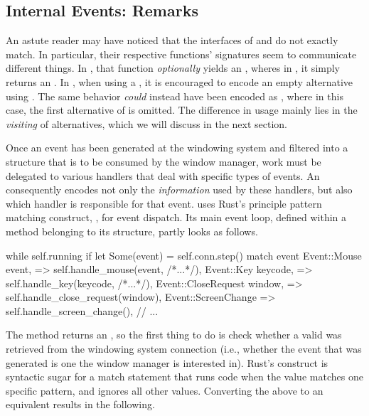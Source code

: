 \subsection{Internal Events: Remarks}

An astute reader may have noticed that the  interfaces of
\wmrs and \wmcpp do not exactly match. In particular, their respective
 functions' signatures seem to communicate different things. In
\wmrs, that function \textit{optionally} yields an , wheres
in \wmcpp, it simply returns an . In \cpp, when using a
, it is encouraged to encode an empty alternative using
\cite{cppstd}. The same behavior \textit{could} instead
have been encoded as , where in this case, the first
alternative of  is omitted. The difference in usage mainly lies in
the \textit{visiting} of  alternatives, which we will discuss in
the next section.


Once an event has been generated at the windowing system and filtered into a
structure that is to be consumed by the window manager, work must be delegated
to various handlers that deal with specific types of events. An 
consequently encodes not only the \textit{information} used by these handlers,
but also which handler is responsible for that event. \wmrs uses Rust's
principle pattern matching construct, , for event dispatch. Its main
event loop, defined within a method belonging to its  structure,
partly looks as follows.

\begin{rustblock}
  while self.running {
    if let Some(event) = self.conn.step() {
      match event {
        Event::Mouse { event, }
          => self.handle_mouse(event, /*...*/),
        Event::Key { keycode, }
          => self.handle_key(keycode, /*...*/),
        Event::CloseRequest { window, }
          => self.handle_close_request(window),
        Event::ScreenChange
          => self.handle_screen_change(),
        // ...
      }
    }
  }
\end{rustblock}

The  method returns an , so the first thing to do
is check whether a valid  was retrieved from the windowing system
connection (i.e., whether the event that was generated is one the window manager
is interested in). Rust's  construct is syntactic sugar for a
match statement that runs code when the value matches one specific pattern, and
ignores all other values\cite{therustbook}. Converting the above 
to an equivalent  results in the following.

